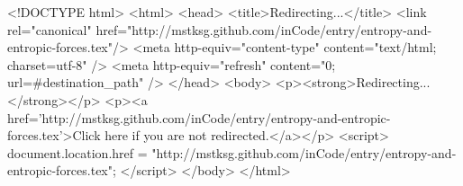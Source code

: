 <!DOCTYPE html>
<html>
<head>
<title>Redirecting...</title>
<link rel="canonical" href="http://mstksg.github.com/inCode/entry/entropy-and-entropic-forces.tex"/>
<meta http-equiv="content-type" content="text/html; charset=utf-8" />
<meta http-equiv="refresh" content="0; url=#{destination_path}" />
</head>
<body>
  <p><strong>Redirecting...</strong></p>
  <p><a href='http://mstksg.github.com/inCode/entry/entropy-and-entropic-forces.tex'>Click here if you are not redirected.</a></p>
  <script>
    document.location.href = "http://mstksg.github.com/inCode/entry/entropy-and-entropic-forces.tex";
  </script>
</body>
</html>
